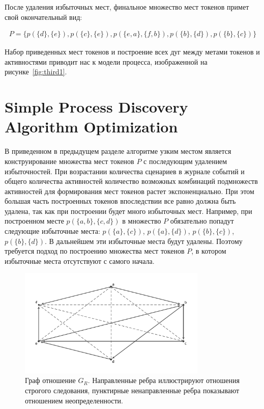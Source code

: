 \documentclass[
11pt,%
tightenlines,%
twoside,%
onecolumn,%
nofloats,%
nobibnotes,%
nofootinbib,%
superscriptaddress,%
noshowpacs,%
centertags]%
{revtex4}
\begin{document}
После удаления избыточных мест, финальное множество мест токенов примет свой окончательный вид:

\begin{equation}
\begin{aligned}
P = \{
p(\{d\}, \{e\}), p(\{c\}, \{e\}), p(\{e, a\}, \{f, b\}), p(\{b\}, \{d\}), p(\{b\}, \{c\})
\}
\end{aligned}
\end{equation}

Набор приведенных мест токенов и построение всех дуг между метами токенов и активностями приводит нас к модели процесса, изображенной на рисунке~\ref{fig:third1}.

\section{Simple Process Discovery Algorithm Optimization}

В приведенном в предыдущем разделе алгоритме узким местом является конструирование множества мест токенов $P$ с последующим удалением избыточностей.
При возрастании количества сценариев в журнале событий и общего количества активностей количество возможных комбинаций подмножеств активностей для формирования мест токенов растет экспоненциально.
При этом большая часть построенных токенов впоследствии все равно должна быть удалена, так как при построении будет много избыточных мест.
Например, при построенном месте $p(\{a, b\}, \{c, d\})$ в множество $P$ обязательно попадут следующие избыточные места: $p(\{a\}, \{c\})$, $p(\{a\}, \{d\})$, $p(\{b\}, \{c\})$, $p(\{b\}, \{d\})$.
В дальнейшем эти избыточные места будут удалены.
Поэтому требуется подход по построению множества мест токенов $P$, в котором избыточные места отсутствуют с самого начала.

\begin{figure}[h]
\setcaptionmargin{5mm}
\includegraphics[width=0.8\textwidth]{pics/g_r.pdf}
\caption{Граф отношение $G_R$. Направленные ребра иллюстрируют отношения строгого следования, пунктирные ненаправленные ребра показывают отношением неопределенности.}
\label{fig:g_r}
\end{figure}
\end{document}
